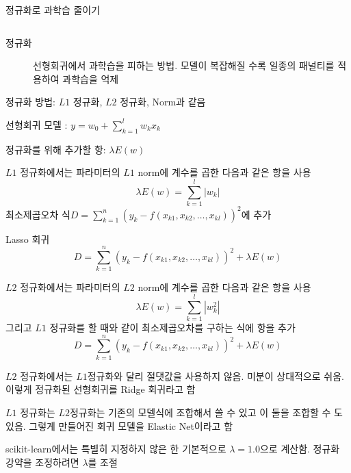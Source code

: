 \documentclass[10pt,t]{beamer}
\begin{document}
\begin{frame} {정규화로 과학습 줄이기}
\begin{columns}
   
\end{columns}

\pagebreak
\begin{description}
    \item[정규화] 선형회귀에서 과학습을 피하는 방법. 모델이 복잡해질 수록 일종의 패널티를 적용하여 과학습을 억제 
\end{description}

정규화 방법: $L1$ 정규화, $L2$ 정규화, Norm과 같음

선형회귀 모델 : $y = w_0 + \sum_{k=1}^l w_k x_k$

정규화를 위해 추가할 항: $\lambda E(w)$

\pagebreak

$L1$ 정규화에서는 파라미터의 $L1$ norm에 계수를 곱한 다음과 같은 항을 사용
\[\lambda E(w) =\sum_{k=1}^l |w_k| \]
최소제곱오차 식$D=\sum_{k=1}^n ( y_k - f(x_{k1}, x_{k2}, \ldots, x_{kl}))^2$에 추가

Lasso 회귀
\[D=\sum_{k=1}^n ( y_k - f(x_{k1}, x_{k2}, \ldots, x_{kl}))^2 + \lambda E(w) \]

\pagebreak
$L2$ 정규화에서는 파라미터의 $L2$ norm에 계수를 곱한 다음과 같은 항을 사용
\[\lambda E(w) =\sum_{k=1}^l |w_k^2|\]
그리고 $L1$ 정규화를 할 때와 같이 최소제곱오차를 구하는 식에 항을 추가
\[D=\sum_{k=1}^n ( y_k - f(x_{k1}, x_{k2}, \ldots, x_{kl}))^2 + \lambda E(w)\]

$L2$ 정규화에서는 $L1$정규화와 달리 절댓값을 사용하지 않음. 미분이 상대적으로 쉬움. 이렇게 정규화된 선형회귀를 Ridge 회귀라고 함

$L1$ 정규화는 $L2$정규화는 기존의 모델식에 조합해서 쓸 수 있고 이 둘을 조합할 수 도 있음. 그렇게 만들어진 회귀 모델을 Elastic Net이라고 함

scikit-learn에서는 특별히 지정하지 않은 한 기본적으로 $\lambda = 1.0$으로 계산함. 정규화 강약을 조정하려면 $\lambda$를 조절
\end{frame}
\end{document}
